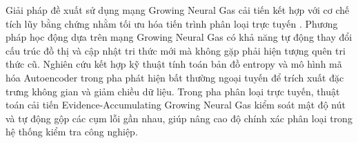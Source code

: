 Giải pháp đề xuất sử dụng mạng Growing Neural Gas cải tiến kết hợp với cơ chế tích lũy bằng chứng nhằm tối ưu hóa tiến trình phân loại trực tuyến \cite{fritzke1995growing}. Phương pháp học động dựa trên mạng Growing Neural Gas có khả năng tự động thay đổi cấu trúc đồ thị và cập nhật tri thức mới mà không gặp phải hiện tượng quên tri thức cũ. Nghiên cứu kết hợp kỹ thuật tính toán bản đồ entropy và mô hình mã hóa Autoencoder trong pha phát hiện bất thường ngoại tuyến để trích xuất đặc trưng không gian và giảm chiều dữ liệu. Trong pha phân loại trực tuyến, thuật toán cải tiến Evidence-Accumulating Growing Neural Gas kiểm soát mật độ nút và tự động gộp các cụm lỗi gần nhau, giúp nâng cao độ chính xác phân loại trong hệ thống kiểm tra công nghiệp.